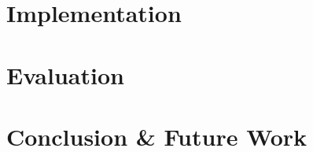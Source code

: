 \documentclass[bachelor,english]{infothesis}
\begin{document}
\chapter{Implementation}
	

%	

\chapter{Evaluation}
	

\chapter{Conclusion \& Future Work}
	

%	
	
\end{document}
